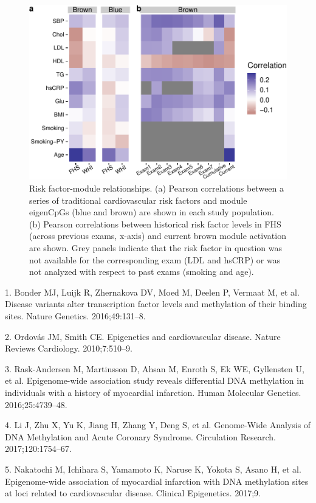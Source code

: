 \documentclass[]{bmcart}
\begin{document}
\begin{figure}[htbp]
\centering
\includegraphics{../doc/module_ewas/figures/risk-factor-correlation-plots-1.pdf}
\caption{\label{fig:risk-factor-correlation-plots}Risk factor-module
relationships. (a) Pearson correlations between a series of traditional
cardiovascular risk factors and module eigenCpGs (blue and brown) are
shown in each study population. (b) Pearson correlations between
historical risk factor levels in FHS (across previous exams, x-axis) and
current brown module activation are shown. Grey panels indicate that
the risk factor in question was not available for the corresponding exam
(LDL and hsCRP) or was not analyzed with respect to past exams (smoking
and age).}
\end{figure}

1. Bonder MJ, Luijk R, Zhernakova DV, Moed M, Deelen P, Vermaat M, et
al. Disease variants alter transcription factor levels and methylation
of their binding sites. Nature Genetics. 2016;49:131--8.

2. Ordov{á}s JM, Smith CE. Epigenetics and cardiovascular disease.
Nature Reviews Cardiology. 2010;7:510--9.

3. Rask-Andersen M, Martinsson D, Ahsan M, Enroth S, Ek WE, Gyllensten
U, et al. Epigenome-wide association study reveals differential DNA
methylation in individuals with a history of myocardial infarction.
Human Molecular Genetics. 2016;25:4739--48.

4. Li J, Zhu X, Yu K, Jiang H, Zhang Y, Deng S, et al. Genome-Wide
Analysis of DNA Methylation and Acute Coronary Syndrome. Circulation
Research. 2017;120:1754--67.

5. Nakatochi M, Ichihara S, Yamamoto K, Naruse K, Yokota S, Asano H, et
al. Epigenome-wide association of myocardial infarction with DNA
methylation sites at loci related to cardiovascular disease. Clinical
Epigenetics. 2017;9.
\end{document}

